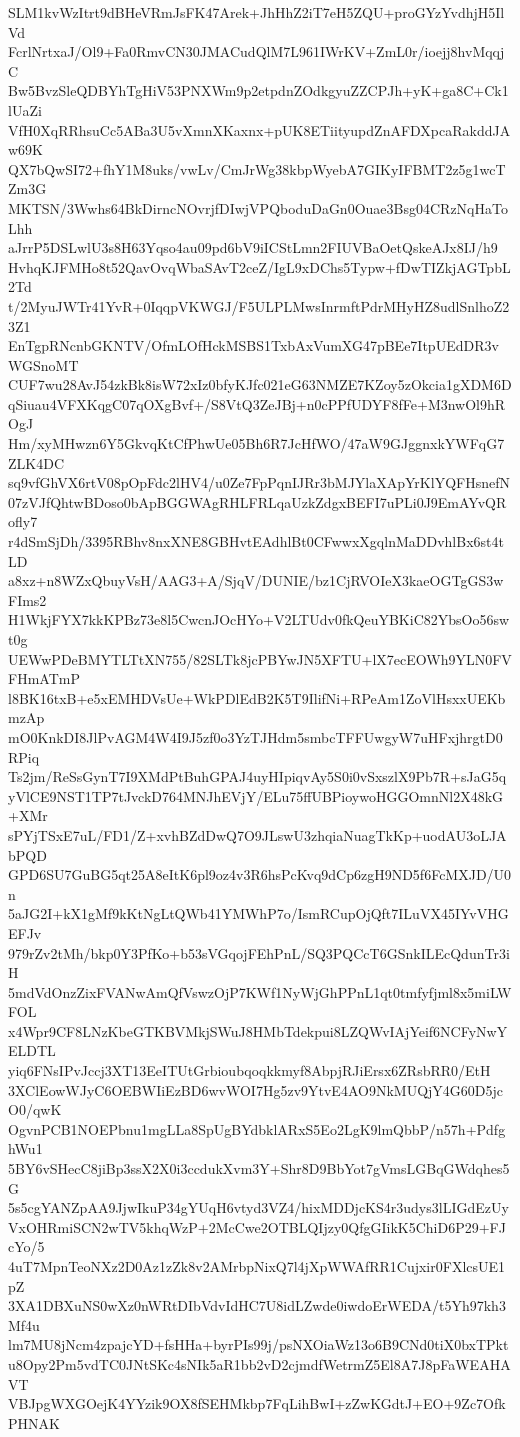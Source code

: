 SLM1kvWzItrt9dBHeVRmJsFK47Arek+JhHhZ2iT7eH5ZQU+proGYzYvdhjH5IlVd
FcrlNrtxaJ/Ol9+Fa0RmvCN30JMACudQlM7L961IWrKV+ZmL0r/ioejj8hvMqqjC
Bw5BvzSleQDBYhTgHiV53PNXWm9p2etpdnZOdkgyuZZCPJh+yK+ga8C+Ck1lUaZi
VfH0XqRRhsuCc5ABa3U5vXmnXKaxnx+pUK8ETiityupdZnAFDXpcaRakddJAw69K
QX7bQwSI72+fhY1M8uks/vwLv/CmJrWg38kbpWyebA7GIKyIFBMT2z5g1wcTZm3G
MKTSN/3Wwhs64BkDirncNOvrjfDIwjVPQboduDaGn0Ouae3Bsg04CRzNqHaToLhh
aJrrP5DSLwlU3s8H63Yqso4au09pd6bV9iICStLmn2FIUVBaOetQskeAJx8IJ/h9
HvhqKJFMHo8t52QavOvqWbaSAvT2ceZ/IgL9xDChs5Typw+fDwTIZkjAGTpbL2Td
t/2MyuJWTr41YvR+0IqqpVKWGJ/F5ULPLMwsInrmftPdrMHyHZ8udlSnlhoZ23Z1
EnTgpRNcnbGKNTV/OfmLOfHckMSBS1TxbAxVumXG47pBEe7ItpUEdDR3vWGSnoMT
CUF7wu28AvJ54zkBk8isW72xIz0bfyKJfc021eG63NMZE7KZoy5zOkcia1gXDM6D
qSiuau4VFXKqgC07qOXgBvf+/S8VtQ3ZeJBj+n0cPPfUDYF8fFe+M3nwOl9hROgJ
Hm/xyMHwzn6Y5GkvqKtCfPhwUe05Bh6R7JcHfWO/47aW9GJggnxkYWFqG7ZLK4DC
sq9vfGhVX6rtV08pOpFdc2lHV4/u0Ze7FpPqnIJRr3bMJYlaXApYrKlYQFHsnefN
07zVJfQhtwBDoso0bApBGGWAgRHLFRLqaUzkZdgxBEFI7uPLi0J9EmAYvQRofly7
r4dSmSjDh/3395RBhv8nxXNE8GBHvtEAdhlBt0CFwwxXgqlnMaDDvhlBx6st4tLD
a8xz+n8WZxQbuyVsH/AAG3+A/SjqV/DUNIE/bz1CjRVOIeX3kaeOGTgGS3wFIms2
H1WkjFYX7kkKPBz73e8l5CwcnJOcHYo+V2LTUdv0fkQeuYBKiC82YbsOo56swt0g
UEWwPDeBMYTLTtXN755/82SLTk8jcPBYwJN5XFTU+lX7ecEOWh9YLN0FVFHmATmP
l8BK16txB+e5xEMHDVsUe+WkPDlEdB2K5T9IlifNi+RPeAm1ZoVlHsxxUEKbmzAp
mO0KnkDI8JlPvAGM4W4I9J5zf0o3YzTJHdm5smbcTFFUwgyW7uHFxjhrgtD0RPiq
Ts2jm/ReSsGynT7I9XMdPtBuhGPAJ4uyHIpiqvAy5S0i0vSxszlX9Pb7R+sJaG5q
yVlCE9NST1TP7tJvckD764MNJhEVjY/ELu75ffUBPioywoHGGOmnNl2X48kG+XMr
sPYjTSxE7uL/FD1/Z+xvhBZdDwQ7O9JLswU3zhqiaNuagTkKp+uodAU3oLJAbPQD
GPD6SU7GuBG5qt25A8eItK6pl9oz4v3R6hsPcKvq9dCp6zgH9ND5f6FcMXJD/U0n
5aJG2I+kX1gMf9kKtNgLtQWb41YMWhP7o/IsmRCupOjQft7ILuVX45IYvVHGEFJv
979rZv2tMh/bkp0Y3PfKo+b53sVGqojFEhPnL/SQ3PQCcT6GSnkILEcQdunTr3iH
5mdVdOnzZixFVANwAmQfVswzOjP7KWf1NyWjGhPPnL1qt0tmfyfjml8x5miLWFOL
x4Wpr9CF8LNzKbeGTKBVMkjSWuJ8HMbTdekpui8LZQWvIAjYeif6NCFyNwYELDTL
yiq6FNsIPvJccj3XT13EeITUtGrbioubqoqkkmyf8AbpjRJiErsx6ZRsbRR0/EtH
3XClEowWJyC6OEBWIiEzBD6wvWOI7Hg5zv9YtvE4AO9NkMUQjY4G60D5jcO0/qwK
OgvnPCB1NOEPbnu1mgLLa8SpUgBYdbklARxS5Eo2LgK9lmQbbP/n57h+PdfghWu1
5BY6vSHecC8jiBp3ssX2X0i3ccdukXvm3Y+Shr8D9BbYot7gVmsLGBqGWdqhes5G
5s5cgYANZpAA9JjwIkuP34gYUqH6vtyd3VZ4/hixMDDjcKS4r3udys3lLIGdEzUy
VxOHRmiSCN2wTV5khqWzP+2McCwe2OTBLQIjzy0QfgGIikK5ChiD6P29+FJcYo/5
4uT7MpnTeoNXz2D0Az1zZk8v2AMrbpNixQ7l4jXpWWAfRR1Cujxir0FXlcsUE1pZ
3XA1DBXuNS0wXz0nWRtDIbVdvIdHC7U8idLZwde0iwdoErWEDA/t5Yh97kh3Mf4u
lm7MU8jNcm4zpajcYD+fsHHa+byrPIs99j/psNXOiaWz13o6B9CNd0tiX0bxTPkt
u8Opy2Pm5vdTC0JNtSKc4sNIk5aR1bb2vD2cjmdfWetrmZ5El8A7J8pFaWEAHAVT
VBJpgWXGOejK4YYzik9OX8fSEHMkbp7FqLihBwI+zZwKGdtJ+EO+9Zc7OfkPHNAK
